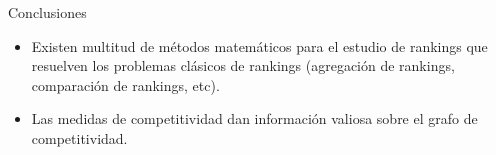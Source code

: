 \documentclass[10pt,hyperref={unicode}]{beamer}
\begin{document}
	\begin{frame}{Conclusiones}
	\begin{itemize}
		\item Existen multitud de métodos matemáticos para el estudio de rankings que resuelven los problemas clásicos de rankings (agregación de rankings, comparación de rankings, etc).
		
		\item Las medidas de competitividad dan información valiosa sobre el grafo de competitividad.
	\end{itemize}
	\end{frame}
%	
	
	
	
\end{document}
